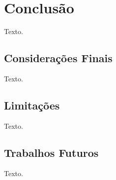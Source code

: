 \chapter{Conclusão}
\label{sec-conclusoes}

Texto.


\section{Considerações Finais}
\label{sec-conclusoes-consideracoes}

Texto.


\section{Limitações}
\label{sec-conclusoes-limitacoes}

Texto.


\section{Trabalhos Futuros}
\label{sec-conclusoes-trabalhosfuturos}

Texto.
